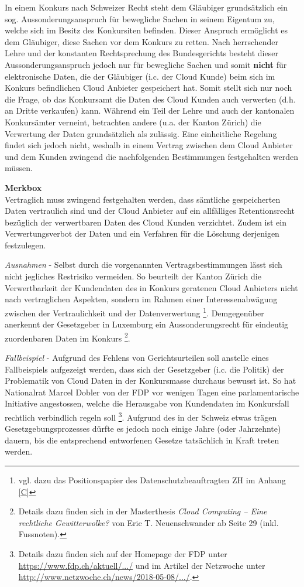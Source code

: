 \documentclass[a4paper,pointlessnumbers]{scrreprt}
\newcommand{\merkbox}[2][0.8\textwidth]{ \begin{center} \begin{tcolorbox}[enhanced, drop fuzzy midday shadow, width={#1}, opacityframe=0.5, colframe=BrickRed, colback=white] {\ECFTeenSpirit \color{BrickRed}\textbf{Merkbox} \qquad {\tiny das gilt es zu beachten}} \\  #2 \end{tcolorbox} \end{center}}
\begin{document}
In einem Konkurs nach Schweizer Recht steht dem Gläubiger grundsätzlich ein sog. Aussonderungsanspruch für bewegliche Sachen in seinem Eigentum zu, welche sich im Besitz des Konkursiten befinden. Dieser Anspruch ermöglicht es dem Gläubiger, diese Sachen vor dem Konkurs zu retten. Nach herrschender Lehre und der konstanten Rechtsprechung des Bundesgerichts besteht dieser Aussonderungsanspruch jedoch nur für bewegliche Sachen und somit \textbf{nicht} für elektronische Daten, die der Gläubiger (i.c. der Cloud Kunde) beim sich im Konkurs befindlichen Cloud Anbieter gespeichert hat. Somit stellt sich nur noch die Frage, ob das Konkursamt die Daten des Cloud Kunden auch verwerten (d.h. an Dritte verkaufen) kann. Während ein Teil der Lehre und auch der kantonalen Konkursämter verneint, betrachten andere (u.a. der Kanton Zürich) die Verwertung der Daten grundsätzlich als zulässig. Eine einheitliche Regelung findet sich jedoch nicht, weshalb in einem Vertrag zwischen dem Cloud Anbieter und dem Kunden zwingend die nachfolgenden Bestimmungen festgehalten werden müssen.

\merkbox[0.7\textwidth]{Vertraglich muss zwingend festgehalten werden, dass sämtliche gespeicherten Daten vertraulich sind und der Cloud Anbieter auf ein allfälliges Retentionsrecht bezüglich der verwertbaren Daten des Cloud Kunden verzichtet. Zudem ist ein Verwertungsverbot der Daten und ein Verfahren für die Löschung derjenigen festzulegen.}

\textit{Ausnahmen} - Selbst durch die vorgenannten Vertragsbestimmungen lässt sich nicht jegliches Restrisiko vermeiden. So beurteilt der Kanton Zürich die Verwertbarkeit der Kundendaten des in Konkurs geratenen Cloud Anbieters nicht nach vertraglichen Aspekten, sondern im Rahmen einer Interessenabwägung zwischen der Vertraulichkeit und der Datenverwertung \footnote{vgl. dazu das Positionspapier des Datenschutzbeauftragten ZH im Anhang \ref{C}}. Demgegenüber anerkennt der Gesetzgeber in Luxemburg ein Aussonderungsrecht für eindeutig zuordenbaren Daten im Konkurs \footnote{Details dazu finden sich in der Masterthesis \textit{Cloud Computing – Eine rechtliche Gewitterwolke?} von Eric T. Neuenschwander ab Seite 29 (inkl. Fussnoten).}.

\textit{Fallbeispiel} - Aufgrund des Fehlens von Gerichtsurteilen soll anstelle eines Fallbeispiels aufgezeigt werden, dass sich der Gesetzgeber (i.c. die Politik) der Problematik von Cloud Daten in der Konkursmasse durchaus bewusst ist. So hat Nationalrat Marcel Dobler von der FDP vor wenigen Tagen eine parlamentarische Initiative angestossen, welche die Herausgabe von Kundendaten im Konkursfall rechtlich verbindlich regeln soll \footnote{Details dazu finden sich auf der Homepage der FDP unter \href{https://www.fdp.ch/aktuell/blog/blog-detail/news/cloud-speicher-die-datenherausgabe-im-konkurs-muss-geregelt-werden/}{https://www.fdp.ch/aktuell/.../} und im Artikel der Netzwoche unter \href{http://www.netzwoche.ch/news/2018-05-08/daten-sollen-nach-provider-konkurs-herausgegeben-werden}{http://www.netzwoche.ch/news/2018-05-08/.../}.}. Aufgrund des in der Schweiz etwas trägen Gesetzgebungsprozesses dürfte es jedoch noch einige Jahre (oder Jahrzehnte) dauern, bis die entsprechend entworfenen Gesetze tatsächlich in Kraft treten werden.
\end{document}
